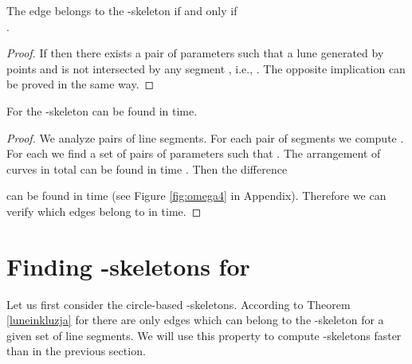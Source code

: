\documentclass[11pt]{llncs}
\begin{document}
\begin{lemma}
The edge  belongs to the -skeleton  if and only if \\
. 
\end{lemma}
\begin{proof}
If 
then there exists a pair of parameters  such that 
a lune generated by points  and  is not intersected 
by any segment , i.e., .
The opposite implication can be proved in the same way.
\end{proof}

\begin{theorem}
\label{lambda4}
For  the -skeleton  can be found 
in  time.
\end{theorem}
\begin{proof}
We analyze  pairs of line segments. For each pair of segments  
we compute . 
For each  we find a set of pairs of parameters
 such that .
The arrangement of  curves in total can be found in  time
\cite{gr04}. 
Then the difference 

can be found in  time (see Figure \ref{fig:omega4} in Appendix). 
Therefore we can verify which edges belong to  in  time. 
\end{proof}









\section{Finding -skeletons for }

Let us first consider the circle-based -skeletons. According to Theorem \ref{luneinkluzja} for  there are only 
edges which can belong to the -skeleton for a given set of line segments.
  We will use this property to compute -skeletons faster than in the previous 
section.  
\end{document}
